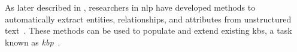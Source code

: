 
As later described in , researchers in \acl{nlp} have developed methods to automatically extract entities, relationships, and attributes from unstructured text~\cite{entityorientedsearch2018balog}. These methods can be used to populate and extend existing \acp{kb}, a task known as \emph{\acl{kbp}}~\cite{entityorientedsearch2018balog}.